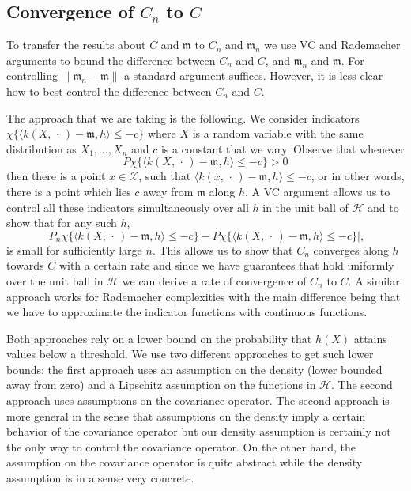\documentclass[10pt]{amsart}
\theoremstyle{definition}\newtheorem{defi}[theo]{Definition}\newtheorem{rema}[theo]{Remark}\newtheorem{exam}[theo]{Example}\newtheorem{exem}[theo]{Example}\newtheorem{nota}[theo]{Notation}
\theoremstyle{remark}
\newcommand{\X}{\mathcal{X}}
\newcommand{\cH}{\mathcal{H}}
\newcommand{\mean}{\mathfrak{m}}
\begin{document}
\subsection{Convergence of \texorpdfstring{$C_n$}{C\_n} to \texorpdfstring{$C$}{C}}

To transfer the results about $C$ and $\mean$ to $C_n$ and $\mean_n$ we use VC and Rademacher arguments to bound the difference between $C_n$ and $C$, and $\mean_n$ and $\mean$. For controlling $\|\mean_n - \mean\|$ a standard argument suffices. However, it is less clear how to best control the difference between $C_n$ and $C$.


The approach that we are taking is the following. We consider indicators\linebreak ${\chi \{\langle k(X,\,\cdot\,) - \mean, h \rangle \leq -c \}}$ where $X$ is a random variable with the same distribution as $X_1,\dots, X_n$ and $c$ is a constant that we vary. Observe that whenever
\[
P \chi\{ \langle k(X,\,\cdot\,) - \mean, h \rangle \leq -c \} > 0
\]
then there is a point $x\in \X$, such that $\langle k(x,\,\cdot\,) - \mean, h \rangle \leq -c$, or in other words, there is a point which lies $c$ away from $\mean$ along $h$. A VC argument allows us to control all these indicators simultaneously over all $h$ in the unit ball of $\cH$ and to show that for any such $h$,
\[
\bigl|P_n \chi\{ \langle k(X,\,\cdot\,) - \mean, h \rangle \leq -c \} - P \chi\{ \langle k(X,\,\cdot\,) - \mean, h \rangle \leq -c \}\bigr|,
\]
is small for sufficiently large $n$. This allows us to show that $C_n$ converges along $h$ towards $C$ with a certain rate and since we have guarantees that hold uniformly over the unit ball in $\cH$ we can derive a rate of convergence of $C_n$ to $C$. A similar approach works for Rademacher complexities with the main difference being that we have to approximate the indicator functions with continuous functions.

Both approaches rely on a lower bound on the probability that $h(X)$ attains values below a threshold. We use two different approaches to get such lower bounds: the first approach uses an assumption on the density (lower bounded away from zero) and a Lipschitz assumption on the functions in $\cH$. The second approach uses assumptions on the covariance operator. The second approach is more general in the sense that assumptions on the density imply a certain behavior of the covariance operator but our density assumption is certainly not the only way to control the covariance operator. On the other hand, the assumption on the covariance operator is quite abstract while the density assumption is in a sense very concrete.
\end{document}
